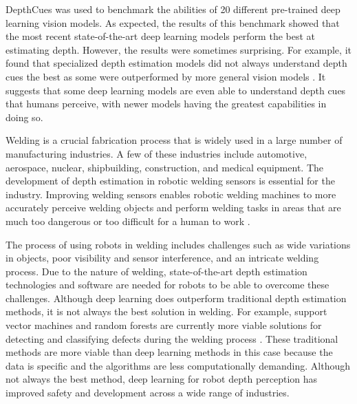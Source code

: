 \documentclass[conference]{IEEEtran}
\begin{document}
DepthCues was used to benchmark the abilities of 20 different pre-trained deep learning vision models. As expected, the results of this benchmark showed that the most recent state-of-the-art deep learning models perform the best at estimating depth. However, the results were sometimes surprising. For example, it found that specialized depth estimation models did not always understand depth cues the best as some were outperformed by more general vision models \cite{danier2025}. It suggests that some deep learning models are even able to understand depth cues that humans perceive, with newer models having the greatest capabilities in doing so.
\par
Welding is a crucial fabrication process that is widely used in a large number of manufacturing industries. A few of these industries include automotive, aerospace, nuclear, shipbuilding, construction, and medical equipment. The development of depth estimation in robotic welding sensors is essential for the industry. Improving welding sensors enables robotic welding machines to more accurately perceive welding objects and perform welding tasks in areas that are much too dangerous or too difficult for a human to work \cite{wang2023}.
\par
The process of using robots in welding includes challenges such as wide variations in objects, poor visibility and sensor interference, and an intricate welding process. Due to the nature of welding, state-of-the-art depth estimation technologies and software are needed for robots to be able to overcome these challenges. Although deep learning does outperform traditional depth estimation methods, it is not always the best solution in welding. For example, support vector machines and random forests are currently more viable solutions for detecting and classifying defects during the welding process \cite{wang2023}. These traditional methods are more viable than deep learning methods in this case because the data is specific and the algorithms are less computationally demanding. Although not always the best method, deep learning for robot depth perception has improved safety and development across a wide range of industries.
\end{document}
